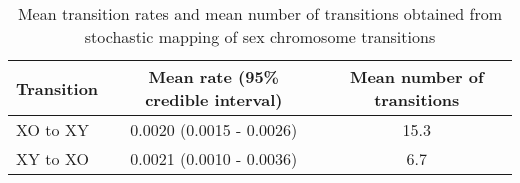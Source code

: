 \begin{table}[ht]
\begin{tabular}{lcc}
\hline
\textbf{Transition} & \textbf{Mean rate (95\% credible interval)} & \textbf{Mean number of transitions} \\ \hline
XO to XY            & 0.0020 (0.0015 - 0.0026)                    & 15.3                                \\
XY to XO            & 0.0021 (0.0010 - 0.0036)                    & 6.7                                 \\ \hline
\end{tabular}
\caption{Mean transition rates and mean number of transitions obtained from stochastic mapping of sex chromosome transitions}
\label{tab:simmap.summary}
\end{table}
